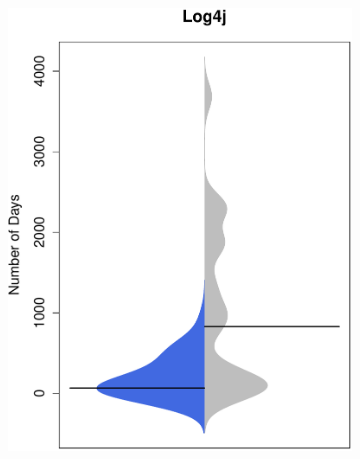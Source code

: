 \begin{figure}[t]
\begin{subfigure}[b]{0.20\textwidth}
	 		\includegraphics[width=\textwidth]{figures/test/log4j_update.pdf}
	 		\label{fig:removal_comparison_hadoop}
	 	\end{subfigure}
	 	~ 
	 	~
	 	~ 
	 	\begin{subfigure}[b]{0.20\textwidth}

\end{subfigure}
\end{figure}

